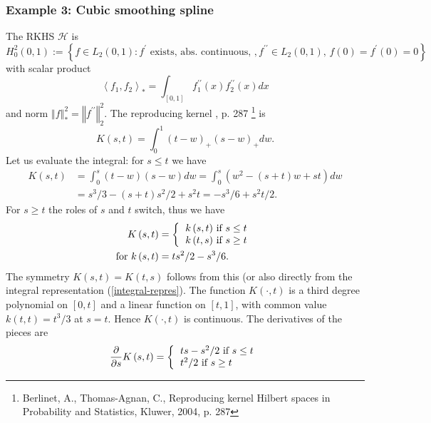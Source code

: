 \documentclass[11pt,twoside]{article}%
\theoremstyle{change}
\begin{document}
\subsubsection{Example 3: Cubic smoothing spline}

The RKHS $\mathcal{H}$ is
\[
H_{0}^{2}(0,1):=\left\{  f\in L_{2}(0,1):f^{\prime}\text{ exists, abs.
continuous, },f^{\prime\prime}\in L_{2}(0,1)\text{, }f(0)=f^{\prime
}(0)=0\right\}
\]
with scalar product
\[
\left\langle f_{1},f_{2}\right\rangle _{\ast}=\int_{[0,1]}f_{1}^{\prime\prime
}(x)f_{2}^{\prime\prime}(x)dx
\]
and norm $\left\Vert f\right\Vert _{\ast}^{2}=\left\Vert f^{\prime\prime
}\right\Vert _{2}^{2}$. The reproducing kernel \cite{BTA}, p. 287
\footnote{Berlinet, A., Thomas-Agnan, C., Reproducing kernel Hilbert spaces in
Probability and Statistics, Kluwer, 2004, p. 287} is%
\begin{equation}
K\left(  s,t\right)  =\int_{0}^{1}\left(  t-w\right)  _{+}\left(  s-w\right)
_{+}dw.\label{integral-repres}%
\end{equation}
Let us evaluate the integral: for $s\leq t$ we have
\begin{align*}
K\left(  s,t\right)   & =\int_{0}^{s}\left(  t-w\right)  \left(  s-w\right)
dw=\int_{0}^{s}\left(  w^{2}-(s+t)w+st\right)  dw\\
& =s^{3}/3-(s+t)s^{2}/2+s^{2}t=-s^{3}/6+s^{2}t/2.
\end{align*}
For $s\geq t$ the roles of $s$ and $t$ switch, thus we have
\begin{align*}
K\left(  s,t\right)   & =\left\{
\begin{tabular}
[c]{l}%
$k\left(  s,t\right)  $ if $s\leq t$\\
$k\left(  t,s\right)  $ if $s\geq t$%
\end{tabular}
\right. \\
\text{for }k\left(  s,t\right)   & =ts^{2}/2-s^{3}/6.
\end{align*}
The symmetry $K\left(  s,t\right)  =K\left(  t,s\right)  $ follows from this
(or also directly from the integral representation (\ref{integral-repres}).
The function $K\left(  \cdot,t\right)  $ is a third degree polynomial on
$\left[  0,t\right]  $ and a linear function on $\left[  t,1\right]  $, with
common value $k\left(  t,t\right)  =t^{3}/3$ at $s=t$. Hence $K\left(
\cdot,t\right)  $ is continuous. The derivatives of the pieces are
\[
\frac{\partial}{\partial s}K\left(  s,t\right)  =\left\{
\begin{tabular}
[c]{l}%
$ts-s^{2}/2$ if $s\leq t$\\
$t^{2}/2$ if $s\geq t$%
\end{tabular}
\right.
\]
\end{document}

